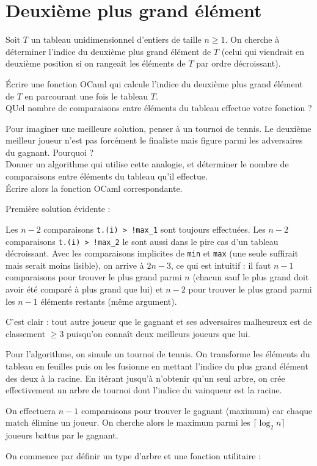 \renewcommand{\SourceFile}{1-parcours-de-tableaux/src/1-4.ml}

\vspace{16pt}
\section{Deuxième plus grand élément}

Soit $T$ un tableau unidimensionnel d'entiers de taille $n\geq 1$. On cherche à déterminer l'indice du deuxième plus grand élément de $T$ (celui qui viendrait en deuxième position si on rangeait les éléments de $T$ par ordre décroissant).

\Q
Écrire une fonction OCaml qui calcule l'indice du deuxième plus grand élément de $T$ en parcourant une fois le tableau $T$.\\
QUel nombre de comparaisons entre éléments du tableau effectue votre fonction ?

\Q
Pour imaginer une meilleure solution, penser à un tournoi de tennis. Le deuxième meilleur joueur n'est pas forcément le finaliste mais figure parmi les adversaires du gagnant. Pourquoi ?\\
Donner un algorithme qui utilise cette analogie, et déterminer le nombre de comparaisons entre éléments du tableau qu'il effectue.\\
Écrire alors la fonction OCaml correspondante.

\Corrige

\Q
Première solution évidente :



Les $n-2$ comparaisons \texttt{t.(i) > !max\_1} sont toujours effectuées. Les $n-2$ comparaisons \texttt{t.(i) > !max\_2} le sont aussi dans le pire cas d'un tableau décroissant. Avec les comparaisons implicites de \texttt{min} et \texttt{max} (une seule suffirait mais serait moins lisible), on arrive à $2n-3$, ce qui est intuitif : il faut $n-1$ comparaisons pour trouver le plus grand parmi $n$ (chacun sauf le plus grand doit avoir été comparé à plus grand que lui) et $n-2$ pour trouver le plus grand parmi les $n-1$ éléments restants (même argument).

\Q
C'est clair : tout autre joueur que le gagnant et ses adversaires malheureux est de classement $\geq 3$ puisqu'on connaît deux meilleurs joueurs que lui.
\medskip

Pour l'algorithme, on simule un tournoi de tennis. On transforme les éléments du tableau en feuilles puis on les fusionne en mettant l'indice du plus grand élément des deux à la racine. En itérant jusqu'à n'obtenir qu'un seul arbre, on crée effectivement un arbre de tournoi dont l'indice du vainqueur est la racine.
\medskip

On effectuera $n-1$ comparaisons pour trouver le gagnant (maximum) car chaque match élimine un joueur. On cherche alors le maximum parmi les $\lceil \log_2 n \rceil$ joueurs battus par le gagnant.
\medskip

On commence par définir un type d'arbre et une fonction utilitaire :





\Fin
